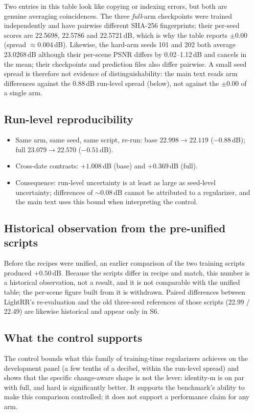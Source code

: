 \documentclass[10pt]{article}
\begin{document}
Two entries in this table look like copying or indexing errors, but both are genuine
averaging coincidences. The three \emph{full}-arm checkpoints were trained
independently and have pairwise different SHA-256 fingerprints; their per-seed
scores are 22.5698, 22.5786 and 22.5721\,dB, which is why the table reports
$\pm0.00$ (spread $\approx$0.004\,dB). Likewise, the hard-arm seeds 101 and 202
both average 23.0268\,dB although their per-scene PSNR differs by 0.02--1.12\,dB
and cancels in the mean; their checkpoints and prediction files also differ
pairwise. A small seed spread is therefore not evidence of distinguishability:
the main text reads arm differences against the 0.88\,dB run-level spread (below),
not against the $\pm0.00$ of a single arm.

\subsection{Run-level reproducibility}
\begin{itemize}
\item Same arm, same seed, same script, re-run: base $22.998\rightarrow22.119$
  ($-0.88$\,dB); full $23.079\rightarrow22.570$ ($-0.51$\,dB).
\item Cross-date contrasts: $+1.008$\,dB (base) and $+0.369$\,dB (full).
\item Consequence: run-level uncertainty is at least as large as seed-level
  uncertainty; differences of $\sim$0.08\,dB cannot be attributed to a regularizer,
  and the main text uses this bound when interpreting the control.
\end{itemize}

\subsection{Historical observation from the pre-unified scripts}
Before the recipes were unified, an earlier comparison of the two training scripts
produced $+0.50$\,dB. Because the scripts differ in recipe and match, this number is a
historical observation, not a result, and it is not comparable with the unified table;
the per-scene figure built from it is withdrawn. Paired differences between
LightRR's re-evaluation and the old three-seed references of those scripts
(22.99 / 22.49) are likewise historical and appear only in S6.

\subsection{What the control supports}
The control bounds what this family of training-time regularizers achieves on the
development panel (a few tenths of a decibel, within the run-level spread) and shows
that the specific change-aware shape is not the lever: identity-m is on par with
full, and hard is significantly better. It supports the benchmark's ability to make
this comparison controlled; it does not support a performance claim for any arm.
\end{document}
